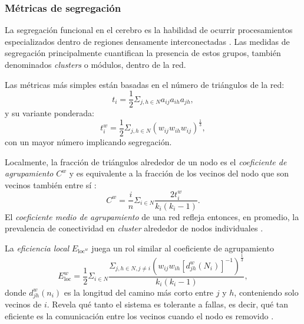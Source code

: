 \subsubsection{Métricas de segregación}
La segregación funcional en el cerebro es la habilidad de ocurrir procesamientos especializados dentro de regiones densamente interconectadas \parencite{Tononi1994}.
Las medidas de segregación principalmente cuantifican la presencia de estos grupos, también denominados \textit{clusters} o módulos, dentro de la red. \par
Las métricas más simples están basadas en el número de triángulos de la red:
\begin{equation}\label{eqTriangles1}
    t_i=\frac{1}{2}\Sigma_{j,h \in N}a_{ij}a_{ih}a_{jh},
\end{equation}
y su variante ponderada:
\begin{equation}\label{eqTriangles2}
    t_i^w=\frac{1}{2}\Sigma_{j,h \in N}(w_{ij}w_{ih}w_{ij})^{\frac{1}{3}},
\end{equation}
con un mayor número implicando segregación.\par
Localmente, la fracción de triángulos alrededor de un nodo es el \emph{coeficiente de agrupamiento} $C^w$ y es equivalente a la fracción de los vecinos del nodo que son vecinos también entre sí \parencite{Watts1998,Onnela2005}:
\begin{equation}\label{eqClusterCoeff}
    C^w=\frac{i}{n}\Sigma_{i \in N}\frac{2t_i^w}{k_i(k_i-1)}.
\end{equation}
El \emph{coeficiente medio de agrupamiento} de una red refleja entonces, en promedio, la prevalencia de conectividad en \textit{cluster} alrededor de nodos individuales \parencite{Rubinov2010}. \par
La \emph{eficiencia local} $E_{\text{loc}^w}$ juega un rol similar al coeficiente de agrupamiento
\begin{equation}\label{eqEloc}
    E_{\text{loc}}^w=\frac{1}{2}\Sigma_{i \in N}\frac{\Sigma_{j,h \in N, j \neq i}(w_{ij}w_{ih}[d_{jh}^w(N_i)]^{-1})^\frac{1}{3}}{k_i(k_i-1)},
\end{equation}
donde $d_{jh}^w(n_i)$ es la longitud del camino más corto entre $j$ y $h$, conteniendo solo vecinos de $i$. Revela qué tanto el sistema es tolerante a fallas, es decir, qué tan eficiente es la comunicación entre los vecinos cuando el nodo es removido \parencite{Latora2001}.

